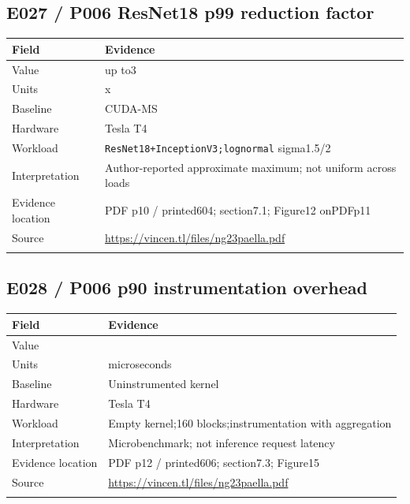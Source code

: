 \subsection*{E027 / P006 ResNet18 p99 reduction factor}

\begin{longtable}{>{\raggedright\arraybackslash}p{}>{\raggedright\arraybackslash}p{}}
\toprule
\textbf{Field} & \textbf{Evidence}\\\midrule\endhead
Value & up to3\\\addlinespace
Units & x\\\addlinespace
Baseline & CUDA-MS\\\addlinespace
Hardware & Tesla T4\\\addlinespace
Workload & \nolinkurl{ResNet18+InceptionV3;lognormal} sigma1.5/2\\\addlinespace
Interpretation & Author-reported approximate maximum; not uniform across loads\\\addlinespace
Evidence location & PDF p10 / printed604; section7.1; Figure12 onPDFp11\\\addlinespace
Source & \url{https://vincen.tl/files/ng23paella.pdf}\\\addlinespace
\bottomrule\end{longtable}

\subsection*{E028 / P006 p90 instrumentation overhead}

\begin{longtable}{>{\raggedright\arraybackslash}p{}>{\raggedright\arraybackslash}p{}}
\toprule
\textbf{Field} & \textbf{Evidence}\\\midrule\endhead
Value & 6.6\\\addlinespace
Units & microseconds\\\addlinespace
Baseline & Uninstrumented kernel\\\addlinespace
Hardware & Tesla T4\\\addlinespace
Workload & Empty kernel;160 blocks;instrumentation with aggregation\\\addlinespace
Interpretation & Microbenchmark; not inference request latency\\\addlinespace
Evidence location & PDF p12 / printed606; section7.3; Figure15\\\addlinespace
Source & \url{https://vincen.tl/files/ng23paella.pdf}\\\addlinespace
\bottomrule\end{longtable}

